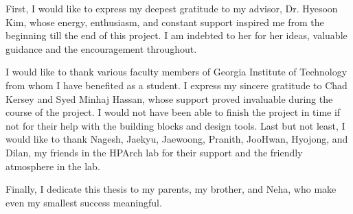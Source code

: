 \setcounter{equation}{0}
First, I would like to express my deepest gratitude to my advisor, Dr. Hyesoon Kim, whose energy, enthusiasm, and constant support inspired me from the beginning till the end of this project. I am indebted to her for her ideas, valuable guidance and the encouragement throughout. 

I would like to thank various faculty members of Georgia Institute of Technology from whom I have benefited as a student. 
I express my sincere gratitude to Chad Kersey and Syed Minhaj Hassan, whose support proved invaluable during the course of the project. I would not have been able to finish the project in time if not for their help with the building blocks and design tools. Last but not least, I would like to thank Nagesh, Jaekyu, Jaewoong, Pranith, JooHwan, Hyojong, and Dilan, my friends in the HPArch lab for their support and the friendly atmosphere in the lab. 

Finally, I dedicate this thesis to my parents, my brother, and Neha, who make even my smallest success meaningful.
